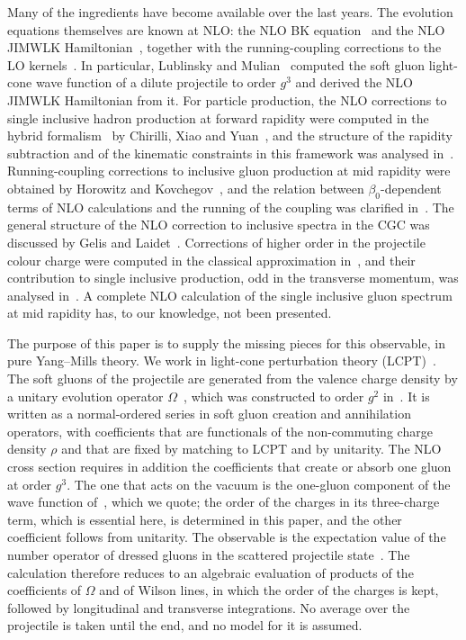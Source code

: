 Many of the ingredients have become available over the last years. The evolution equations themselves are known at NLO: the NLO BK equation~\cite{Balitsky:2007feb} and the NLO JIMWLK Hamiltonian~\cite{Balitsky:2013fea,Kovner:2013ona,Kovner:2014lca,Grabovsky:2013mba}, together with the running-coupling corrections to the LO kernels~\cite{Balitsky:2006wa,Kovchegov:2006vj,Kovchegov:2006wf}. In particular, Lublinsky and Mulian~\cite{Lublinsky:2016meo} computed the soft gluon light-cone wave function of a dilute projectile to order $g^3$ and derived the NLO JIMWLK Hamiltonian from it. For particle production, the NLO corrections to single inclusive hadron production at forward rapidity were computed in the hybrid formalism~\cite{Dumitru:2005gt,Altinoluk:2011qy} by Chirilli, Xiao and Yuan~\cite{Chirilli:2011km,Chirilli:2012jd}, and the structure of the rapidity subtraction and of the kinematic constraints in this framework was analysed in~\cite{Stasto:2013cha,Altinoluk:2014eka,Ducloue:2016shw}. Running-coupling corrections to inclusive gluon production at mid rapidity were obtained by Horowitz and Kovchegov~\cite{Horowitz:2010yg}, and the relation between $\beta_0$-dependent terms of NLO calculations and the running of the coupling was clarified in~\cite{Kovner:2023vsy}. The general structure of the NLO correction to inclusive spectra in the CGC was discussed by Gelis and Laidet~\cite{Gelis:2012ri}. Corrections of higher order in the projectile colour charge were computed in the classical approximation in~\cite{Chirilli:2015tea,Li:2021zmf,Li:2021ntm}, and their contribution to single inclusive production, odd in the transverse momentum, was analysed in~\cite{McLerran:2016snu,Kovchegov:2018jun}. A complete NLO calculation of the single inclusive gluon spectrum at mid rapidity has, to our knowledge, not been presented.

The purpose of this paper is to supply the missing pieces for this observable, in pure Yang--Mills theory. We work in light-cone perturbation theory (LCPT)~\cite{Lepage:1980fj,Brodsky:1997de}. The soft gluons of the projectile are generated from the valence charge density by a unitary evolution operator $\Omega$~\cite{Kovner:2005en}, which was constructed to order $g^2$ in~\cite{Radhakrishnan:2026soft}. It is written as a normal-ordered series in soft gluon creation and annihilation operators, with coefficients that are functionals of the non-commuting charge density $\rho$ and that are fixed by matching to LCPT and by unitarity. The NLO cross section requires in addition the coefficients that create or absorb one gluon at order $g^3$. The one that acts on the vacuum is the one-gluon component of the wave function of~\cite{Lublinsky:2016meo}, which we quote; the order of the charges in its three-charge term, which is essential here, is determined in this paper, and the other coefficient follows from unitarity. The observable is the expectation value of the number operator of dressed gluons in the scattered projectile state~\cite{Kovner:2006wr}. The calculation therefore reduces to an algebraic evaluation of products of the coefficients of $\Omega$ and of Wilson lines, in which the order of the charges is kept, followed by longitudinal and transverse integrations. No average over the projectile is taken until the end, and no model for it is assumed.

